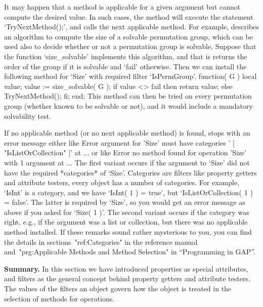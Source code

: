 It may happen that a method is applicable for a given argument
but cannot compute the desired value.
In such cases, the method will execute the statement `TryNextMethod();',
%
and {\GAP} calls the next applicable method.
For example, \cite{Sims90b} describes an algorithm to compute the size
of a solvable permutation group, which can be used also to decide
whether or not a permutation group is solvable.
Suppose that the function `size_solvable' implements this algorithm,
and that is returns the order of the group if it is solvable and
`fail' otherwise.
Then we can install the following method for `Size' with required
filter `IsPermGroup'.
\begintt
function( G )
local  value;
    value := size_solvable( G );
    if value <> fail  then  return value;
                      else  TryNextMethod();  fi;
end;
\endtt
This method can then be tried on every permutation group (whether known
to be  solvable or  not),  and it would  include a  mandatory solvability
test.

If no applicable method  (or no next applicable  method) is found, {\GAP}
stops with an error message either like
\begintt
Error argument for 'Size' must have categories '
[ "IsListOrCollection" ]' at ...
\endtt
or like
\begintt
Error no method found for operation 'Size' with 1 argument at ...
\endtt
The first variant occurs if the argument to `Size' did not have the
required *categories* of `Size'.
Categories are filters like property getters and attribute testers,
every {\GAP} object has a number of categories.
For example, `IsInt' is a category, and we have `IsInt( 1 ) = true',
but `IsListOrCollection( 1 ) = false'.
The latter is required by `Size',
so you would get an error message as above if you asked for `Size( 1 )'. 
The  second variant   occurs if the   category  was right, e.g.,   if the
argument  was a list  or collection,  but there  was no applicable method
installed. If these remarks sound rather mysterious  to you, you can find
the details in  sections~"ref:Categories" in the reference manual
and~"prg:Applicable Methods and
Method Selection" in ``Programming in GAP''.

{\bf Summary.} In this section we have introduced properties as special
attributes, and filters as the general concept behind property getters
and attribute testers.
The values of the filters an object govern how the object is treated
in the selection of methods for operations.

\null

